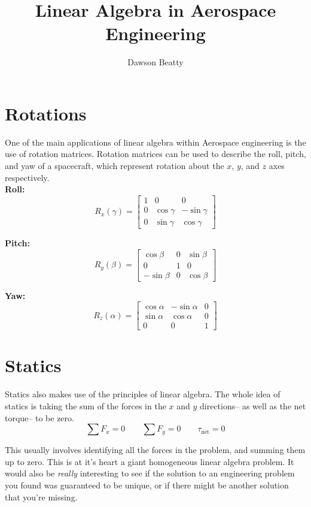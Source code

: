 \documentclass[10pt,letterpaper]{article}
\title{Linear Algebra in Aerospace Engineering}
\author{Dawson Beatty}
\begin{document}
	\maketitle
	\section*{Rotations}
	One of the main applications of linear algebra within Aerospace engineering is the use of rotation matrices.  Rotation matrices can be used to describe the roll, pitch, and yaw of a spacecraft, which represent rotation about the $x$, $y$, and $z$ axes respectively. \\
	
	\textbf{Roll:}
	$$
	R_x(\gamma) = \begin{bmatrix}
	1 & 0 & 0 \\ 0 & \cos \gamma & -\sin \gamma \\ 0 & \sin \gamma & \cos \gamma 
	\end{bmatrix}
	$$
	
	\textbf{Pitch:}
	$$
	R_y( \beta ) = \begin{bmatrix}
	\cos \beta & 0 & \sin \beta \\ 0 & 1 & 0 \\ - \sin \beta & 0 & \cos \beta
	\end{bmatrix}
	$$
	
	\textbf{Yaw:}
	$$
	R_z( \alpha) = \begin{bmatrix}
	\cos \alpha & - \sin \alpha & 0 \\ \sin \alpha & \cos \alpha & 0 \\ 0 & 0 & 1
	\end{bmatrix}
	$$
	
	\section*{Statics}
	
	Statics also makes use of the principles of linear algebra.  The whole idea of statics is taking the sum of the forces in the $x$ and $y$ directions-- as well as the net torque-- to be zero. 
	$$
	\sum F_x = 0 \qquad \sum F_y = 0 \qquad \tau_{\text{net}} = 0
	$$ 
	
	This usually involves identifying all the forces in the problem, and summing them up to zero.  This is at it's heart a giant homogeneous linear algebra problem. It would also be \textit{really} interesting to see if the solution to an engineering problem you found was guaranteed to be unique, or if there might be another solution that you're missing. 
	
\end{document}
